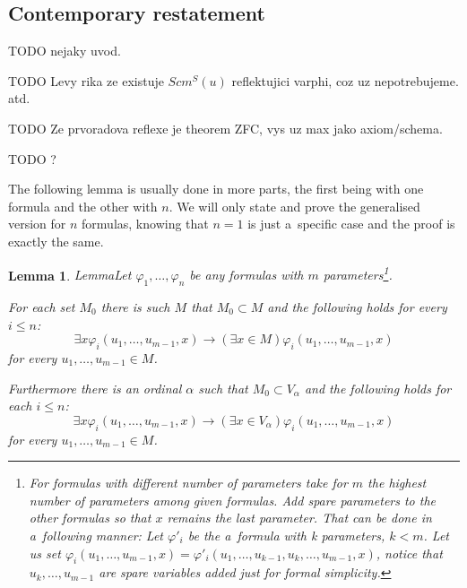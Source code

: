\documentclass[12pt,a4paper]{article}
\newtheorem{lemma}[theorem]{Lemma}
\newcommand{\then}{\rightarrow}
\newcommand{\bce}{\begin{compactenum}}
\newcommand{\ece}{\end{compactenum}}
\begin{document}

\subsection{Contemporary restatement}
TODO nejaky uvod. 

TODO Levy rika ze existuje $Scm^S(u)$ reflektujici varphi, coz uz nepotrebujeme. atd.

TODO Ze prvoradova reflexe je theorem ZFC, vys uz max jako axiom/schema.

TODO ?

The following lemma is usually done in more parts, the first being with one formula and the other with $n$. We will only state and prove the generalised version for $n$ formulas, knowing that $n=1$ is just a~specific case and the proof is exactly the same.

\begin{lemma}{Lemma}\label{lemma:reflection_lemma}
Let $\varphi_1, \ldots, \varphi_n$ be any formulas with $m$ parameters\footnote{For formulas with different number of parameters take for $m$ the highest number of parameters among given formulas. Add spare parameters to the other formulas so that $x$ remains the last parameter. That can be done in a~following manner: Let $\varphi'_i$ be the a~formula with k parameters, $k < m$. Let us set $\varphi_i(u_1, \ldots, u_{m-1}, x) = \varphi'_i(u_1, \ldots, u_{k-1}, u_k, \ldots, u_{m-1}, x)$, notice that $u_k, \ldots, u_{m-1}$ are spare variables added just for formal simplicity.}. 
\bce[(i)]
\item For each set $M_0$ there is such $M$ that $M_0 \subset M$ and the following holds for every $i \leq n$:
\begin{equation}
\exists x \varphi_i(u_1, \ldots, u_{m-1}, x) \then (\exists x \in M) \varphi_i(u_1, \ldots, u_{m-1}, x)
\end{equation}
for every $u_1, \ldots, u_{m-1} \in M$.

\item Furthermore there is an ordinal $\alpha$ such that $M_0 \subset V_\alpha$ and the following holds for each $i \leq n$:
\begin{equation}
\exists x \varphi_i(u_1, \ldots, u_{m-1}, x) \then (\exists x \in V_\alpha) \varphi_i(u_1, \ldots, u_{m-1}, x)
\end{equation}
for every $u_1, \ldots, u_{m-1} \in M$.
\ece
\end{lemma}
\end{document}
